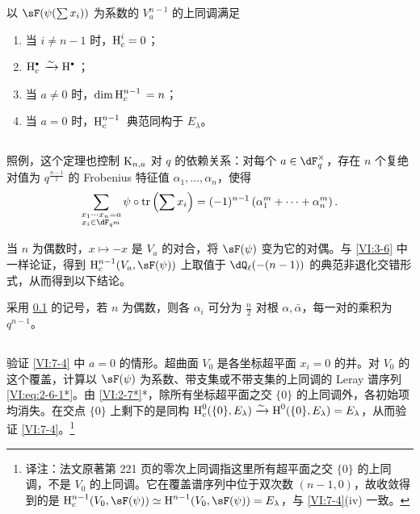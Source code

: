 \begin{theorem_}\label{VI:7-4}
以 $\sF(\psi(\sum x_i))$ 为系数的 $V_a^{n-1}$ 的上同调满足
\begin{enumerate}[\indent (i)]
  \item 当 $i\ne n-1$ 时，$\operatorname{H}_c^i=0$；
  \item $\h_c^\bullet{} \iso \h^\bullet{}$；
  \item 当 $a\ne 0$ 时，$\dim \operatorname{H}_c^{n-1}{}=n$；
  \item 当 $a=0$ 时，$\operatorname{H}_c^{n-1}{}$ 典范同构于 $E_\lambda$。
\end{enumerate}
\end{theorem_}

\subsection{}\label{VI:7-5}

照例，这个定理也控制 $\textnormal{K}_{n,a}$ 对 $q$ 的依赖关系：对每个 $a\in \dF_q^\times$，存在 $n$ 个复绝对值为 $q^{\frac{n-1}{2}}$ 的 Frobenius 特征值 $\alpha_1,\dots,\alpha_n$，使得
\[
  \sum_{\substack{x_1\dotsm x_n = a \\ x_i\in \dF_{q^m}}} \psi\circ \tr\left(\sum x_i\right) = (-1)^{n-1} \left(\alpha_1^m + \cdots + \alpha_n^m \right) \text{.}
\]

当 $n$ 为偶数时，$x\mapsto -x$ 是 $V_a$ 的对合，将 $\sF(\psi)$ 变为它的对偶。与 \ref{VI:3-6} 中一样论证，得到 $\h_c^{n-1}(V_a,\sF(\psi))$ 上取值于 $\dQ_\ell(-(n-1))$ 的典范非退化交错形式，从而得到以下结论。

\begin{corollary_}\label{VI:7-6}
采用 \ref{VI:7-5} 的记号，若 $n$ 为偶数，则各 $\alpha_i$ 可分为 $\frac n 2$ 对根 $\alpha,\bar\alpha$，每一对的乘积为 $q^{n-1}$。
\end{corollary_}

\subsection{}\label{VI:7-7}

验证 \ref{VI:7-4} 中 $a=0$ 的情形。超曲面 $V_0$ 是各坐标超平面 $x_i=0$ 的并。对 $V_0$ 的这个覆盖，计算以 $\sF(\psi)$ 为系数、带支集或不带支集的上同调的 Leray 谱序列 \eqref{VI:eq:2-6-1*}。由 \ref{VI:2-7*}*，除所有坐标超平面之交 $\{0\}$ 的上同调外，各初始项均消失。在交点 $\{0\}$ 上剩下的是同构 $\operatorname{H}_c^0(\{0\},E_\lambda)\xrightarrow\sim \operatorname{H}^0(\{0\},E_\lambda)=E_\lambda$，从而验证 \ref{VI:7-4}。\footnote{译注：法文原著第 221 页的零次上同调指这里所有超平面之交 $\{0\}$ 的上同调，不是 $V_0$ 的上同调。它在覆盖谱序列中位于双次数 $(n-1,0)$，故收敛得到的是 $\h_c^{n-1}(V_0,\sF(\psi))\simeq\h^{n-1}(V_0,\sF(\psi))=E_\lambda$，与 \ref{VI:7-4}(iv) 一致。}

